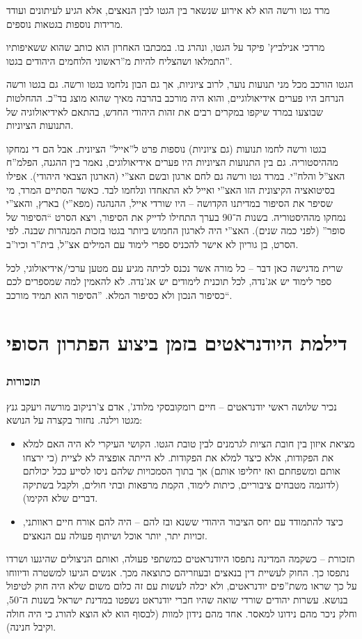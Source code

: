 \documentclass[]{article}
\begin{document}
	מרד גטו ורשה הוא לא אירוע שנשאר בין הגטו לבין הנאצים, אלא הגיע לעיתונים ועודד מרידות נוספות בגטאות נוספים. 
	
	מרדכי אנילביץ' פיקד על הגטו, ונהרג בו. במכתבו האחרון הוא כותב שהוא ששאיפותיו התמלאו ושהצליח להיות מ''ראשוני הלוחמים היהודים בגטו''. 
	
	הגטו הורכב מכל מני תנועות נוער, לרוב ציוניות, אך גם הבון נלחמו בגטו ורשה. גם בגטו ורשה הנרחב היו פערים אידיאולוגיים, והוא היה מורכב בהרבה מאיך שהוא מוצג בד''כ. ההחלטות שבוצעו במרד שיקפו במקרים רבים את זהות היהודי החדש, בהתאם לאידיאולוגיה של התנועות הציוניות. 
	
	בגטו ורשה לחמו תנועות (גם ציוניות) נוספות פרט ל''אייל'' הציונית. אבל הם די נמחקו מההיסטוריה. גם בין התנועות הציוניות היו פערים אידיאולוגים, נאמר בין ההגנה, הפלמ''ח האצ''ל והלח''י. במרד גטו ורשה גם לחם ארגון ובשם האצ''י (הארגון הצבאי היהודי). אפילו בסיטואציה הקיצונית הזו האצ''י ואייל לא התאחדו ונלחמו לבד. כאשר הסתיים המרד, מי שסיפר את הסיפור במדיתנו הקדושה – היו שורדי אייל, ההנהגה (מפא''י) בארץ, והאצ''י נמחקו מההיסטוריה. בשנות ה־90 בערך התחילו לדייק את הסיפור, ויצא הסרט ``הסיפור של סופר'' (לפני כמה שנים). האצ''י היה לארגון החמוש ביותר בגטו בזכות המנהרות שבנה. לפי הסרט, בן גוריון לא אישר להכניס ספרי לימוד עם המילים אצ''ל, בית''ר וכיו''ב. 
	
	שרית מדגישה כאן דבר – כל מורה אשר נכנס לכיתה מגיע עם מטען ערכי/אידיאולוגי, לכל ספר לימוד יש אג'נדה, לכל תוכנית לימודים יש אג'נדה. לא להאמין למה שמספרים לכם כסיפור הנכון ולא כסיפור המלא. ''הסיפור הוא תמיד מורכב``. 
	
	\section{דילמת היודנראטים בזמן ביצוע הפתרון הסופי}
	\subsubsection{תזכורות}
	נכיר שלושה ראשי יודנראטים – חיים רומקובסקי מלודג', אדם צ'רניקוב מורשה ויעקב גנץ מגטו וילנה. נחזור בקצרה על הנושא: 
	\begin{itemize}
		\item מציאת איזון בין חובת הציות לגרמנים לבין טובת הגטו. הקושי העיקרי לא היה האם למלא את הפקודות, אלא כיצד למלא את הפקודות. לא הייתה אופציה לא לציית (כי ירצחו אותם ומשפחתם ואז יחליפו אותם) אך בתוך הסמכויות שלהם ניסו לסייע ככל יכולתם (לדוגמה מטבחים ציבוריים, כיתות לימוד, הקמת מרפאות ובתי חולים, ולקבל בשתיקה דברים שלא הקימו). 
		\item כיצד להתמודד עם יחס הציבור היהודי ששנא ובז להם – היה להם אורח חיים ראוותני, זכויות יתר, יותר אוכל ושיתוף פעולה עם הנאצים. 
	\end{itemize}
	תזכורת – כשקמה המדינה נתפסו היודנראטים כמשתפי פעולה, ואותם הניצולים שהיגעו ושרדו נתפסו כך. החוק לעשיית דין בנאצים ובעוזריהם כתוצאה מכך. אנשים הגיעו למשטרה ודיווחו על כך שראו משת''פים יודנראטים, ולא יכלה לעשות עם זה כלום משום שלא היה חוק לטיפול בנושא. עשרות יהודים שורדי שואה שהיו חברי יודנראט נשפטו במדינת ישראל בשנות ה־50, וחלק ניכר מהם נידונו למאסר. אחד מהם נידון למוות (לבסוף הוא לא הוצא להורג כי היה חולה וקיבל חנינה). 
	
\end{document}

